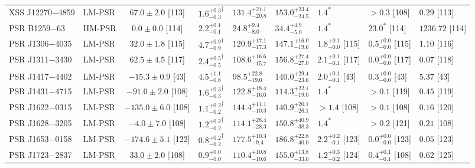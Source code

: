 \begin{table*}
\begin{adjustbox}{width=0.98\textwidth}
\begin{threeparttable}
\begin{tabular}{llcllllll}
      XSS J12270$-$4859    & LM-PSR   & $  67.0\pm  2.0$ [113] & ${1.6^{+0.3}_{-0.3}}^\dag$  & $131.4^{+21.1}_{-20.8}$   & $153.0^{+23.4}_{-24.5}$   & $1.4^\ast$                & $>0.3$ [108]                 & $0.29$ [113] \\
      PSR B1259$-$63       & HM-PSR   & $   0.0\pm  0.0$ [114] & $2.2^{+0.1}_{-0.1}$         & $24.8^{+9.4}_{-8.0}$      & $34.4^{+4.9}_{-5.0}$      & $1.4^\ast$                & $23.0^\ast$ [114]            & $1236.72$ [114] \\
      PSR J1306$-$4035     & LM-PSR   & $  32.0\pm  1.8$ [115] & ${4.7^{+0.9}_{-0.9}}^\dag$  & $120.9^{+17.1}_{-17.3}$   & $147.1^{+16.0}_{-19.6}$   & $1.8^{+0.1}_{-0.0}$ [115] & $0.5^{+0.0}_{-0.0}$ [115]    & $1.10$ [116] \\
      PSR J1311$-$3430     & LM-PSR   & $  62.5\pm  4.5$ [117] & ${2.4^{+0.5}_{-0.5}}^\dag$  & $108.6^{+16.6}_{-15.7}$   & $156.8^{+27.4}_{-27.0}$   & $2.1^{+0.1}_{-0.1}$ [117] & $0.0^{+0.0}_{-0.0}$ [117]    & $0.07$ [118] \\
      PSR J1417$-$4402     & LM-PSR   & $ -15.3\pm  0.9$ [43]  & $4.5^{+1.1}_{-0.8}$         & $98.5^{+22.8}_{-19.0}$    & $140.0^{+29.4}_{-23.6}$   & $2.0^{+0.1}_{-0.1}$ [43]  & $0.3^{+0.0}_{-0.0}$ [43]     & $5.37$ [43]  \\
      PSR J1431$-$4715     & LM-PSR   & $ -91.0\pm  2.0$ [108] & ${1.6^{+0.3}_{-0.3}}^\dag$  & $122.8^{+18.4}_{-16.0}$   & $114.3^{+22.1}_{-19.0}$   & $1.4^\ast$                & $>0.1$ [119]                 & $0.45$ [119] \\
      PSR J1622$-$0315     & LM-PSR   & $-135.0\pm  6.0$ [108] & ${1.1^{+0.2}_{-0.2}}^\dag$  & $144.4^{+11.1}_{-10.3}$   & $140.9^{+20.1}_{-26.1}$   & $>1.4$ [108]              & $>0.1$ [108]                 & $0.16$ [120] \\
      PSR J1628$-$3205     & LM-PSR   & $  -4.0\pm  7.0$ [108] & ${1.2^{+0.2}_{-0.2}}^\dag$  & $114.1^{+28.4}_{-28.3}$   & $150.8^{+40.9}_{-38.3}$   & $1.4^\ast$                & $>0.2$ [121]                 & $0.21$ [108] \\
      PSR J1653$-$0158     & LM-PSR   & $-174.6\pm  5.1$ [122] & ${0.8^{+0.2}_{-0.2}}^\dag$  & $177.5^{+10.3}_{-9.4}$    & $186.8^{+22.8}_{-40.0}$   & $2.2^{+0.2}_{-0.1}$ [123] & $0.0^{+0.0}_{-0.0}$ [123]    & $0.05$ [123] \\
      PSR J1723$-$2837     & LM-PSR   & $  33.0\pm  2.0$ [108] & $0.9^{+0.0}_{-0.0}$         & $110.4^{+10.8}_{-10.6}$   & $155.0^{+13.8}_{-33.0}$   & $1.2^{+0.3}_{-0.2}$ [124] & $0.4^{+0.1}_{-0.1}$ [108]    & $0.62$ [125] \\

\end{tabular}
\end{threeparttable}
\end{adjustbox}
\end{table*}
